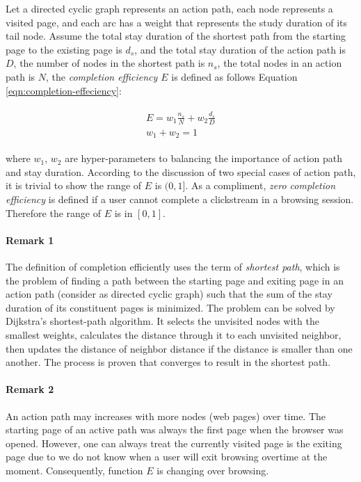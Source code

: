 Let a directed cyclic graph represents an action path, each node represents a visited page, 
and each arc has a weight that represents the study duration of its tail node.
Assume the total stay duration of the shortest path from the starting page to 
the existing page is $d_s$, and the total stay duration of the action path is $D$, 
the number of nodes in the shortest path is $n_s$, the total nodes in an action path is $N$, 
the \emph{completion efficiency $E$} is defined as follows Equation \ref{eqn:completion-effeciency}:

\begin{align}
\label{eqn:completion-effeciency}
\begin{split}
    E = w_1 \frac{n_s}{N} + w_2 \frac{d_s}{D}\\
    w_1 + w_2 = 1
\end{split}
\end{align}

where $w_1$, $w_2$ are hyper-parameters to balancing the importance of action path and 
stay duration. According to the discussion of two special cases of action path, 
it is trivial to show the range of $E$ is $(0, 1]$. As a compliment,
\emph{zero completion efficiency} is defined if a user cannot complete a clickstream 
in a browsing session. Therefore the range of $E$ is in $[0, 1]$.

\paragraph{Remark 1} The definition of completion efficiently uses the term of \emph{shortest path},
which is the problem of finding a path between the starting page and exiting page 
in an action path (consider as directed cyclic graph) such that the sum of the stay duration of 
its constituent pages is minimized.
The problem can be solved by Dijkstra's \cite{dijkstra1959note} shortest-path algorithm. 
It selects the unvisited nodes with the smallest weights, calculates the distance 
through it to each unvisited neighbor, then updates the distance of neighbor distance 
if the distance is smaller than one another. The process is proven that 
converges to result in the shortest path.

\paragraph{Remark 2} An action path may increases with more nodes (web pages) over time.
The starting page of an active path was always the first page when the browser was opened.
However, one can always treat the currently visited page is the exiting page due to we
do not know when a user will exit browsing overtime at the moment. 
Consequently, function $E$ is changing over browsing.

